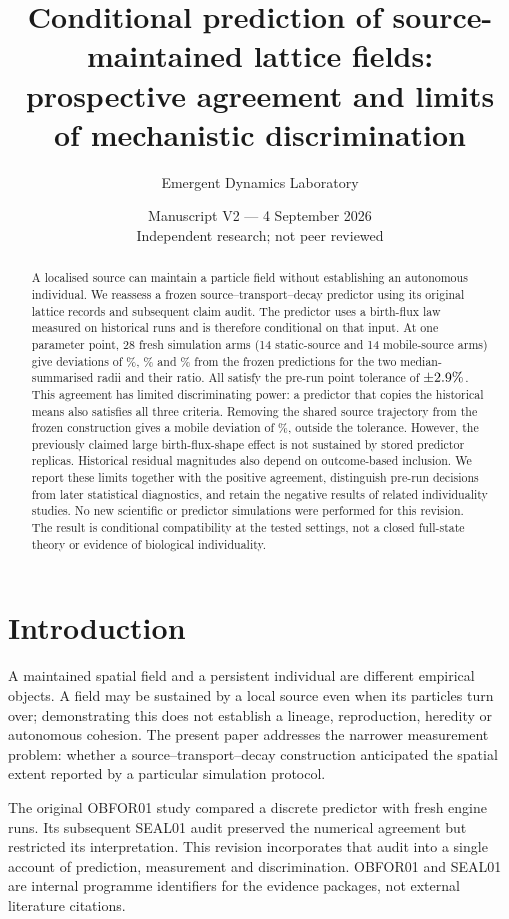 \documentclass[11pt]{article}
\title{\bfseries Conditional prediction of source-maintained lattice fields:\\
prospective agreement and limits of mechanistic discrimination}
\author{Emergent Dynamics Laboratory}
\date{Manuscript V2 --- 4 September 2026\\\small Independent research; not peer reviewed}
\begin{document}
\maketitle
\begin{abstract}
A localised source can maintain a particle field without establishing an autonomous individual.
We reassess a frozen source--transport--decay predictor using its original lattice records and
subsequent claim audit. The predictor uses a birth-flux law measured on historical runs and is
therefore conditional on that input. At one parameter point, 28 fresh simulation arms
(14 static-source and 14 mobile-source arms) give deviations of \VStaticError\%, \VMobileError\%
and \VRatioError\% from the frozen predictions for the two median-summarised radii and their
ratio. All satisfy the pre-run point tolerance of $\pm2.9\%$. This agreement has limited
discriminating power: a predictor that copies the historical means also satisfies all three
criteria. Removing the shared source trajectory from the frozen construction gives a mobile
deviation of \VNoSharedError\%, outside the tolerance. However, the previously claimed large
birth-flux-shape effect is not sustained by stored predictor replicas. Historical residual
magnitudes also depend on outcome-based inclusion. We report these limits together with the
positive agreement, distinguish pre-run decisions from later statistical diagnostics, and
retain the negative results of related individuality studies. No new scientific or predictor
simulations were performed for this revision. The result is conditional compatibility at the
tested settings, not a closed full-state theory or evidence of biological individuality.
\end{abstract}

\section{Introduction}
A maintained spatial field and a persistent individual are different empirical objects.
A field may be sustained by a local source even when its particles turn over; demonstrating this
does not establish a lineage, reproduction, heredity or autonomous cohesion. The present paper
addresses the narrower measurement problem: whether a source--transport--decay construction
anticipated the spatial extent reported by a particular simulation protocol.

The original OBFOR01 study compared a discrete predictor with fresh engine runs. Its subsequent
SEAL01 audit preserved the numerical agreement but restricted its interpretation.
This revision incorporates that audit into a single account of prediction, measurement and
discrimination. OBFOR01 and SEAL01 are internal programme identifiers for the evidence packages,
not external literature citations.
\end{document}
